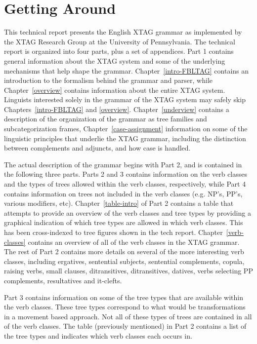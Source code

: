 \chapter{Getting Around} 
 
This technical report presents the English XTAG grammar as implemented by 
the XTAG Research Group at the University of Pennsylvania.  The technical 
report is organized into four parts, plus a set of appendices.  Part 1 
contains general information about the XTAG system and some of the 
underlying mechanisms that help shape the grammar. 
Chapter~\ref{intro-FBLTAG} contains an introduction to the formalism behind 
the grammar and parser, while Chapter~\ref{overview} contains information 
about the entire XTAG system.  Linguists interested solely in the grammar 
of the XTAG system may safely skip Chapters~\ref{intro-FBLTAG} and 
\ref{overview}.  Chapter~\ref{underview} contains a description of the 
organization of the grammar as tree families and subcategorization frames, 
Chapter~\ref{case-assignment} information on some of the linguistic 
principles that underlie the XTAG grammar, including the distinction 
between complements and adjuncts, and how case is handled. 
 
The actual description of the grammar begins with Part 2, and is contained 
in the following three parts.  Parts 2 and 3 contains information on the 
verb classes and the types of trees allowed within the verb classes, 
respectively, while Part 4 contains information on trees not included in 
the verb classes (e.g.  NP's, PP's, various modifiers, etc). 
Chapter~\ref{table-intro} of Part 2 contains a table that attempts to 
provide an overview of the verb classes and tree types by providing a 
graphical indication of which tree types are allowed in which verb classes. 
This has been cross-indexed to tree figures shown in the tech report. 
Chapter~\ref{verb-classes} contains an overview of all of the verb classes 
in the XTAG grammar.  The rest of Part 2 contains more details on several 
of the more interesting verb classes, including ergatives, sentential 
subjects, sentential complements, copula, raising verbs, small clauses, 
ditransitives, ditransitives, datives, verbs selecting PP complements, 
resultatives and it-clefts. 
 
Part 3 contains information on some of the tree types that are available within 
the verb classes.  These tree types correspond to what would be transformations 
in a movement based approach.  Not all of these types of trees are contained in 
all of the verb classes.  The table (previously mentioned) in Part 2 contains a 
list of the tree types and indicates which verb classes each occurs in.  
 
